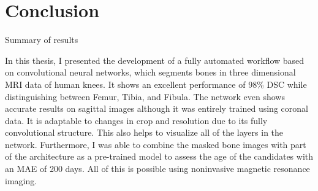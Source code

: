 \section{Conclusion}

Summary of results

In this thesis, I presented the development of a fully automated workflow based on convolutional neural networks, which segments bones in three dimensional MRI data of human knees. It shows an excellent performance of 98\% DSC while distinguishing between Femur, Tibia, and Fibula. The network even shows accurate results on sagittal images although it was entirely trained using coronal data. It is adaptable to changes in crop and resolution due to its fully convolutional structure. This also helps to visualize all of the layers in the network. Furthermore, I was able to combine the masked bone images with part of the architecture as a pre-trained model to assess the age of the candidates with an MAE of 200 days. All of this is possible using noninvasive magnetic resonance imaging.

\newpage